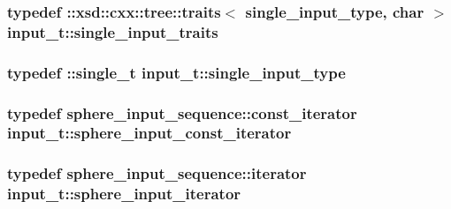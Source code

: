 \subsubsection[{\texorpdfstring{single\+\_\+input\+\_\+traits}{single_input_traits}}]{\setlength{\rightskip}{0pt plus 5cm}typedef \+::xsd\+::cxx\+::tree\+::traits$<$ {\bf single\+\_\+input\+\_\+type}, char $>$ {\bf input\+\_\+t\+::single\+\_\+input\+\_\+traits}}\hypertarget{classinput__t_aa3a5fc9d04df805785a23a89248fa924}{}\label{classinput__t_aa3a5fc9d04df805785a23a89248fa924}
\subsubsection[{\texorpdfstring{single\+\_\+input\+\_\+type}{single_input_type}}]{\setlength{\rightskip}{0pt plus 5cm}typedef \+::{\bf single\+\_\+t} {\bf input\+\_\+t\+::single\+\_\+input\+\_\+type}}\hypertarget{classinput__t_af24fd90c4a0fa092c577776efca1c750}{}\label{classinput__t_af24fd90c4a0fa092c577776efca1c750}
\subsubsection[{\texorpdfstring{sphere\+\_\+input\+\_\+const\+\_\+iterator}{sphere_input_const_iterator}}]{\setlength{\rightskip}{0pt plus 5cm}typedef sphere\+\_\+input\+\_\+sequence\+::const\+\_\+iterator {\bf input\+\_\+t\+::sphere\+\_\+input\+\_\+const\+\_\+iterator}}\hypertarget{classinput__t_aa281fd31856422d1cb3934608b8e0185}{}\label{classinput__t_aa281fd31856422d1cb3934608b8e0185}
\subsubsection[{\texorpdfstring{sphere\+\_\+input\+\_\+iterator}{sphere_input_iterator}}]{\setlength{\rightskip}{0pt plus 5cm}typedef sphere\+\_\+input\+\_\+sequence\+::iterator {\bf input\+\_\+t\+::sphere\+\_\+input\+\_\+iterator}}\hypertarget{classinput__t_ab8ba0d1f12d650cf8f5db6b8262baa0e}{}\label{classinput__t_ab8ba0d1f12d650cf8f5db6b8262baa0e}

